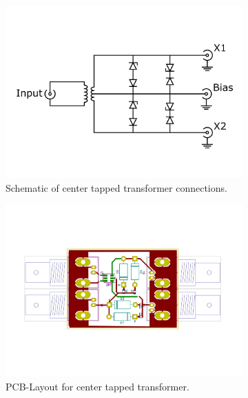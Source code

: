 \begin{figure}[ht]
	\centering
	\begin{subfigure}{0.4\textwidth}
		\centering
		\includegraphics[width=\textwidth]{Chapters/Deflection/circuit_CTT4zu3}
		\caption{Schematic of center tapped transformer connections.}
		\label{fig:circuit_ctt}
	\end{subfigure}
	\hspace{0.1\textwidth}
	\begin{subfigure}{0.4\textwidth}
		\centering
		\includegraphics[width=\textwidth]{Chapters/Deflection/PCB_CTT3}
		\caption{PCB-Layout for center tapped transformer.}
		\label{fig:PCB_CTT}
	\end{subfigure}
	\caption{}
	\label{fig:CTT}
\end{figure}


